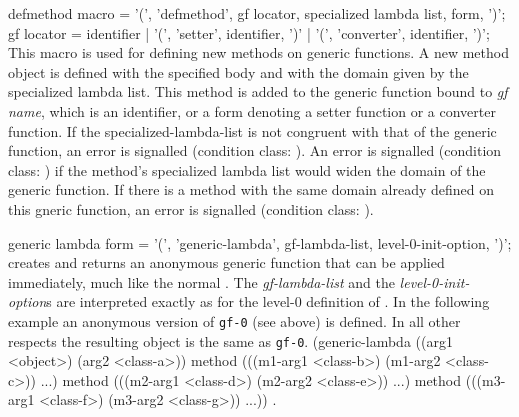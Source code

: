 \begin{optDefinition}
\Syntax
\savesyntax{}\vbox{\syntax
defmethod macro
   = '(', 'defmethod', gf locator,
     specialized lambda list,
     {form}, ')';
gf locator
   = identifier
   | '(', 'setter', identifier, ')'
   | '(', 'converter', identifier, ')';
\endsyntax}
%
\remarks%
This macro is used for defining new methods on generic functions.  A new method
object is defined with the specified body and with the domain given by the
specialized lambda list.  This method is added to the generic function bound to
{\em gf name\/}, which is an identifier, or a form denoting a setter function or
a converter function. If the specialized-lambda-list is not congruent with that
of the generic function, an error is signalled (condition class:
).  An error is signalled (condition
class: 
) if the method's specialized lambda
list would widen the domain of the generic function.  If there is a method with
the same domain already defined on this gneric function, an error is signalled
(condition class:
).

\Syntax
\savesyntax\genericLambdaSyntax\vbox{\syntax
generic lambda form
   = '(', 'generic-lambda', gf-lambda-list,
     {level-0-init-option}, ')';
\endsyntax}
%
\remarks%
 creates and returns an anonymous generic function that
can be applied immediately, much like the normal .  The {\em
    gf-lambda-list} and the {\em level-0-init-option\/}s are interpreted exactly
as for the level-0 definition of .  \examples In the
following example an anonymous version of {\tt gf-0} (see
 above) is defined.  In all other respects the resulting
object is the same as {\tt gf-0}.
%
{\syntax
(generic-lambda ((arg1 <object>) (arg2 <class-a>))
  method (((m1-arg1 <class-b>) (m1-arg2 <class-c>)) ...)
  method (((m2-arg1 <class-d>) (m2-arg2 <class-e>)) ...)
  method (((m3-arg1 <class-f>) (m3-arg2 <class-g>)) ...))
\endsyntax}
%
\seealso%
.
%
\end{optDefinition}

